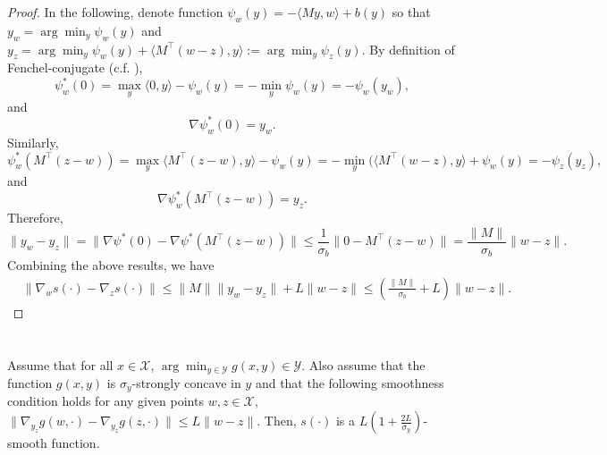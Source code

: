\documentclass[pmlr]{jmlr} %
\newcommand{\yx}[1]{y_{#1}}
\newcommand{\XX}{\mathcal{X}}
\newcommand{\YY}{\mathcal{Y}}
\newcommand{\pr}[1]{\left(#1\right)}
\begin{document}
\begin{proof}
In the following,
denote function  $\psi_{w}(y)= - \langle M y, w \rangle + b(y)$
so that $\yx{w} = \arg\min_{y} \psi_{w}(y)$ and $\yx{z} = \arg\min_{y} \psi_{w}(y) + \langle M^{\top}(w-z), y \rangle
:= \arg\min_{y} \psi_{z}(y)$.
By definition of Fenchel-conjugate (c.f. \cite{R96,BL06}),
\begin{equation}
\psi_{w}^{*}(0) = \max_{y} \langle 0, y \rangle  - \psi_{w}(y) = - \min_{y} \psi_{w}(y) = - \psi_{w}(\yx{w}),
\end{equation}
and
\begin{equation}
\nabla \psi_{w}^{*}(0) = \yx{w}.
\end{equation}
Similarly,
\begin{equation}
\psi_{w}^{*}( M^{\top}(z-w)) = \max_{y} \langle M^{\top} (z-w), y \rangle  - \psi_{w}(y) = - \min_{y} (  
\langle M^{\top}(w-z), y \rangle + \psi_{w}(y) = - \psi_{z}(\yx{z}),
\end{equation}
and
\begin{equation}
\nabla \psi_{w}^{*}( M^{\top}(z-w)) = \yx{z}.
\end{equation}
Therefore,
\begin{equation}
\| \yx{w} - \yx{z} \| = \| \nabla \psi^{*}(0) - \nabla \psi^{*}( M^{\top}(z-w)) \| \leq \frac{1}{\sigma_{b}}  
\| 0 - M^{\top}(z-w)\|  = \frac{\| M\|}{\sigma_{b}} \| w- z \|.
\end{equation}
Combining the above results, we have 
\begin{equation}
\begin{aligned}
& \| \nabla_{w} s(\cdot) - \nabla_{z} s(\cdot ) \| \leq 
\| M\| \|  \yx{w}  - \yx{z}  \| 
+ 
L \| w - z \|  \leq \pr{ \frac{ \| M \|}{\sigma_{b}} + L} \| w - z\|.
\end{aligned}
\end{equation}


\end{proof}


\section{} \label{app:smooth2}


\begin{proposition} \label{thm:smooth2}
Assume that for all $x\in \XX$, $\arg \min_{y\in \YY} g(x,y) \in \YY$. Also assume that the function $g(x,y)$ is $\sigma_{y}$-strongly concave in $y$ and that the following smoothness condition holds for any given points $w,z \in \XX$,
$  \| \nabla_{\yx{z}} g(w,\cdot) - \nabla_{\yx{z}} g(z,\cdot)   \| \le L \| w - z \|.$
Then, $s(\cdot)$ is a $L(1+\frac{2L}{\sigma_{y}})$-smooth function.
\end{proposition}
\end{document}
